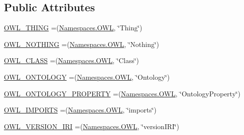 \subsection*{Public Attributes}
\begin{DoxyCompactItemize}
\item 
\hyperlink{enumorg_1_1semanticweb_1_1owlapi_1_1vocab_1_1_o_w_l_r_d_f_vocabulary_a4ebaf8f19f761d0e17bf27209b6b15a2}{O\-W\-L\-\_\-\-T\-H\-I\-N\-G} =(\hyperlink{enumorg_1_1semanticweb_1_1owlapi_1_1vocab_1_1_namespaces_a2fcb537074d9307ef1356ffb6a5bd6f4}{Namespaces.\-O\-W\-L}, \char`\"{}Thing\char`\"{})
\item 
\hyperlink{enumorg_1_1semanticweb_1_1owlapi_1_1vocab_1_1_o_w_l_r_d_f_vocabulary_ad5912d5be7595b662a72ece8bc3be224}{O\-W\-L\-\_\-\-N\-O\-T\-H\-I\-N\-G} =(\hyperlink{enumorg_1_1semanticweb_1_1owlapi_1_1vocab_1_1_namespaces_a2fcb537074d9307ef1356ffb6a5bd6f4}{Namespaces.\-O\-W\-L}, \char`\"{}Nothing\char`\"{})
\item 
\hyperlink{enumorg_1_1semanticweb_1_1owlapi_1_1vocab_1_1_o_w_l_r_d_f_vocabulary_aa589b97fcc9e711fb1723d186b4daec8}{O\-W\-L\-\_\-\-C\-L\-A\-S\-S} =(\hyperlink{enumorg_1_1semanticweb_1_1owlapi_1_1vocab_1_1_namespaces_a2fcb537074d9307ef1356ffb6a5bd6f4}{Namespaces.\-O\-W\-L}, \char`\"{}Class\char`\"{})
\item 
\hyperlink{enumorg_1_1semanticweb_1_1owlapi_1_1vocab_1_1_o_w_l_r_d_f_vocabulary_aac7de7f7f68547f9d6aa0764cd035c6e}{O\-W\-L\-\_\-\-O\-N\-T\-O\-L\-O\-G\-Y} =(\hyperlink{enumorg_1_1semanticweb_1_1owlapi_1_1vocab_1_1_namespaces_a2fcb537074d9307ef1356ffb6a5bd6f4}{Namespaces.\-O\-W\-L}, \char`\"{}Ontology\char`\"{})
\item 
\hyperlink{enumorg_1_1semanticweb_1_1owlapi_1_1vocab_1_1_o_w_l_r_d_f_vocabulary_a0bc16ce61140c1309c71ee1de4b31c23}{O\-W\-L\-\_\-\-O\-N\-T\-O\-L\-O\-G\-Y\-\_\-\-P\-R\-O\-P\-E\-R\-T\-Y} =(\hyperlink{enumorg_1_1semanticweb_1_1owlapi_1_1vocab_1_1_namespaces_a2fcb537074d9307ef1356ffb6a5bd6f4}{Namespaces.\-O\-W\-L}, \char`\"{}Ontology\-Property\char`\"{})
\item 
\hyperlink{enumorg_1_1semanticweb_1_1owlapi_1_1vocab_1_1_o_w_l_r_d_f_vocabulary_a337e0695bec9f4b2af355f5e39eec880}{O\-W\-L\-\_\-\-I\-M\-P\-O\-R\-T\-S} =(\hyperlink{enumorg_1_1semanticweb_1_1owlapi_1_1vocab_1_1_namespaces_a2fcb537074d9307ef1356ffb6a5bd6f4}{Namespaces.\-O\-W\-L}, \char`\"{}imports\char`\"{})
\item 
\hyperlink{enumorg_1_1semanticweb_1_1owlapi_1_1vocab_1_1_o_w_l_r_d_f_vocabulary_a9b69e6f59dd420d913f021a54e861192}{O\-W\-L\-\_\-\-V\-E\-R\-S\-I\-O\-N\-\_\-\-I\-R\-I} =(\hyperlink{enumorg_1_1semanticweb_1_1owlapi_1_1vocab_1_1_namespaces_a2fcb537074d9307ef1356ffb6a5bd6f4}{Namespaces.\-O\-W\-L}, \char`\"{}version\-I\-R\-I\char`\"{})

\end{DoxyCompactItemize}
